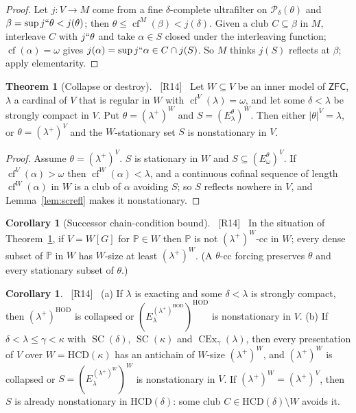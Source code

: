 \documentclass[11pt,letterpaper]{article}
\theoremstyle{definition}
\newtheorem{theorem}[definition]{Theorem}
\newtheorem{corollary}[definition]{Corollary}
\numberwithin{equation}{section}
\newcommand{\ZFC}{\mathsf{ZFC}}
\newcommand{\HOD}{\mathrm{HOD}}
\newcommand{\HCD}{\mathrm{HCD}}
\newcommand{\SC}{\operatorname{SC}}
\newcommand{\CEx}{\operatorname{CEx}}
\newcommand{\cf}{\operatorname{cf}}
\newcommand{\Pow}{\mathcal P}
\newcommand{\PP}{\mathbb P}
\newcommand{\src}[1]{\unskip\ {\normalfont\small\sffamily\color{Olive}[#1]}\ }
\begin{document}
\begin{proof}
Let $j:V\to M$ come from a fine $\delta$-complete ultrafilter on $\Pow_\delta(\theta)$ and $\beta=\sup j``\theta<j(\theta)$; then $\theta\le\cf^M(\beta)<j(\delta)$. Given a club $C\subseteq\beta$ in $M$, interleave $C$ with $j``\theta$ and take $\alpha\in S$ closed under the interleaving function; $\cf(\alpha)=\omega$ gives $j(\alpha)=\sup j``\alpha\in C\cap j(S)$. So $M$ thinks $j(S)$ reflects at $\beta$; apply elementarity.
\end{proof}

\begin{theorem}[Collapse or destroy]\label{thm:successor}\src{R14}
Let $W\subseteq V$ be an inner model of $\ZFC$, $\lambda$ a cardinal of $V$ that is regular in $W$ with $\cf^V(\lambda)=\omega$, and let some $\delta<\lambda$ be strongly compact in $V$. Put $\theta=(\lambda^+)^W$ and $S=(E^\theta_\lambda)^W$. Then either $|\theta|^V=\lambda$, or $\theta=(\lambda^+)^V$ and the $W$-stationary set $S$ is nonstationary in $V$.
\end{theorem}

\begin{proof}
Assume $\theta=(\lambda^+)^V$. $S$ is stationary in $W$ and $S\subseteq(E^\theta_\omega)^V$. If $\cf^V(\alpha)>\omega$ then $\cf^W(\alpha)<\lambda$, and a continuous cofinal sequence of length $\cf^W(\alpha)$ in $W$ is a club of $\alpha$ avoiding $S$; so $S$ reflects nowhere in $V$, and Lemma~\ref{lem:screfl} makes it nonstationary.
\end{proof}

\begin{corollary}[Successor chain-condition bound]\label{cor:succcc}\src{R14}
In the situation of Theorem~\ref{thm:successor}, if $V=W[G]$ for $\PP\in W$ then $\PP$ is not $(\lambda^+)^W$-cc in $W$; every dense subset of $\PP$ in $W$ has $W$-size at least $(\lambda^+)^W$. (A $\theta$-cc forcing preserves $\theta$ and every stationary subset of $\theta$.)
\end{corollary}

\begin{corollary}\label{cor:statapps}\src{R14}
(a) If $\lambda$ is exacting and some $\delta<\lambda$ is strongly compact, then $(\lambda^+)^{\HOD}$ is collapsed or $(E^{(\lambda^+)^{\HOD}}_\lambda)^{\HOD}$ is nonstationary in $V$.
(b) If $\delta<\lambda\le\gamma<\kappa$ with $\SC(\delta)$, $\SC(\kappa)$ and $\CEx_\gamma(\lambda)$, then every presentation of $V$ over $W=\HCD(\kappa)$ has an antichain of $W$-size $(\lambda^+)^W$, and $(\lambda^+)^W$ is collapsed or $S=(E^{(\lambda^+)^W}_\lambda)^W$ is nonstationary in $V$. If $(\lambda^+)^W=(\lambda^+)^V$, then $S$ is already nonstationary in $\HCD(\delta)$: some club $C\in\HCD(\delta)\setminus W$ avoids it.
\end{corollary}
\end{document}
